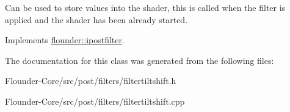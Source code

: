 Can be used to store values into the shader, this is called when the filter is applied and the shader has been already started. 



Implements \hyperlink{classflounder_1_1ipostfilter_a9b658b4672718d5ac36539875bde722e}{flounder\+::ipostfilter}.



The documentation for this class was generated from the following files\+:\begin{DoxyCompactItemize}
\item 
Flounder-\/\+Core/src/post/filters/filtertiltshift.\+h\item 
Flounder-\/\+Core/src/post/filters/filtertiltshift.\+cpp\end{DoxyCompactItemize}
